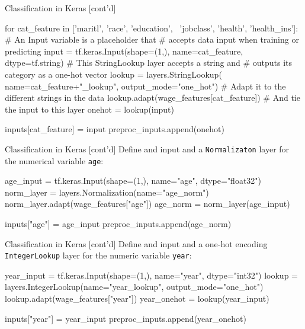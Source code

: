 \documentclass[ignorenonframetext,xcolor=x11names]{beamer}
\begin{document}
\begin{frame}[fragile]{Classification in Keras \small [cont'd]}
\begin{pythoncode}
for cat_feature in ['maritl', 'race', 'education', \
               'jobclass', 'health', 'health_ins']:
    # An Input variable is a placeholder that
    # accepts data input when training or predicting
    input = tf.keras.Input(shape=(1,), 
                           name=cat_feature, 
                           dtype=tf.string)
    # This StringLookup layer accepts a string and 
    # outputs its category as a one-hot vector
    lookup = layers.StringLookup(
        name=cat_feature+"_lookup",
        output_mode="one_hot")
    # Adapt it to the different strings in the data
    lookup.adapt(wage_features[cat_feature])
    # And tie the input to this layer
    onehot = lookup(input)
    
    inputs[cat_feature] = input
    preproc_inputs.append(onehot)
\end{pythoncode}
\end{frame}

\begin{frame}[fragile]{Classification in Keras \small [cont'd]}
Define and input and a \texttt{Normalizaton} layer for the numerical variable \texttt{age}:
\begin{pythoncode}
age_input = tf.keras.Input(shape=(1,), 
                           name="age", 
                           dtype="float32")
norm_layer = layers.Normalization(name="age_norm")
norm_layer.adapt(wage_features["age"])
age_norm = norm_layer(age_input)

inputs["age"] = age_input
preproc_inputs.append(age_norm)
\end{pythoncode}
\end{frame}

\begin{frame}[fragile]{Classification in Keras \small [cont'd]}
Define and input and a one-hot encoding \texttt{IntegerLookup} layer for the numeric variable \texttt{year}:
\begin{pythoncode}
year_input = tf.keras.Input(shape=(1,), 
                           name="year", 
                           dtype="int32")
lookup = layers.IntegerLookup(name="year_lookup",
                              output_mode="one_hot")
lookup.adapt(wage_features["year"])
year_onehot = lookup(year_input)

inputs["year"] = year_input
preproc_inputs.append(year_onehot)
\end{pythoncode}
\end{frame}
\end{document}
